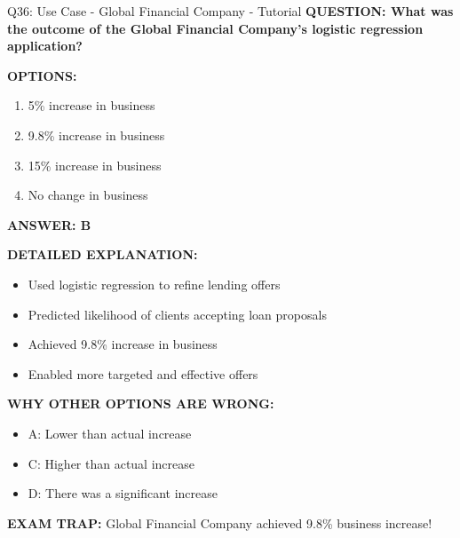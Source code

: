 \documentclass[8pt]{beamer}
\begin{document}
	\begin{frame}{Q36: Use Case - Global Financial Company - Tutorial}
		\fontsize{6.5}{7.5}\selectfont
		\textbf{QUESTION: What was the outcome of the Global Financial Company's logistic regression application?}
		
		\vspace{0.1cm}
		\textbf{OPTIONS:}
		\begin{enumerate}
			\item 5\% increase in business
			\item 9.8\% increase in business
			\item 15\% increase in business
			\item No change in business
		\end{enumerate}
		
		\vspace{0.1cm}
		\textcolor{myblue}{\textbf{ANSWER: B}}
		
		\vspace{0.1cm}
		\textbf{DETAILED EXPLANATION:}
		\begin{itemize}
			\item Used logistic regression to refine lending offers
			\item Predicted likelihood of clients accepting loan proposals
			\item Achieved 9.8\% increase in business
			\item Enabled more targeted and effective offers
		\end{itemize}
		
		\vspace{0.1cm}
		\textcolor{myred}{\textbf{WHY OTHER OPTIONS ARE WRONG:}}
		\begin{itemize}
			\item \textcolor{myred}{A:} Lower than actual increase
			\item \textcolor{myred}{C:} Higher than actual increase
			\item \textcolor{myred}{D:} There was a significant increase
		\end{itemize}
		
		\textcolor{myred}{\textbf{EXAM TRAP:}} Global Financial Company achieved \textcolor{myblue}{9.8\% business increase}!
	\end{frame}
	
\end{document}
